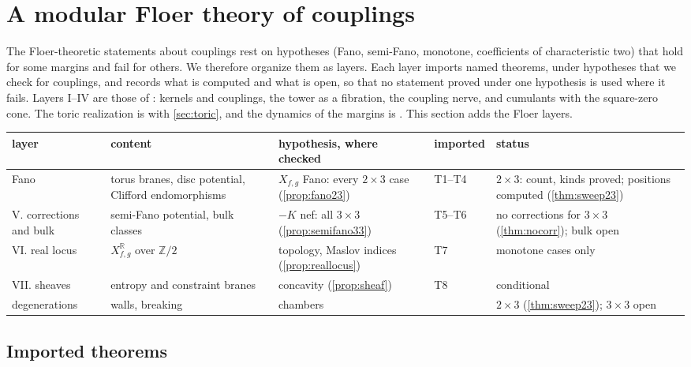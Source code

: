\documentclass[11pt]{article}
\theoremstyle{definition}
\theoremstyle{remark}
\newcommand{\R}{\mathbb{R}}
\newcommand{\Z}{\mathbb{Z}}
\begin{document}
\section{A modular Floer theory of couplings}\label{sec:modular}

The Floer-theoretic statements about couplings rest on hypotheses (Fano, semi-Fano, monotone, coefficients of characteristic
two) that hold for some margins and fail for others. We therefore organize them as layers. Each layer imports named theorems,
under hypotheses that we check for couplings, and records what is computed and what is open, so that no statement proved under
one hypothesis is used where it fails. Layers I--IV are those of \cite{Conditionals}: kernels and couplings, the tower as a
fibration, the coupling nerve, and cumulants with the square-zero cone. The toric realization is \cite[\S6]{Conditionals} with
\cref{sec:toric}, and the dynamics of the margins is \cite{Bands}. This section adds the Floer layers.

\begin{center}
\small
\begin{tabular}{p{2.2cm}p{3.4cm}p{3.4cm}p{1.5cm}p{3.1cm}}
\toprule
layer & content & hypothesis, where checked & imported & status\\
\midrule
Fano & torus branes, disc potential, Clifford endomorphisms & $X_{f,g}$ Fano: every $2\times3$ case (\cref{prop:fano23}) & T1--T4 & $2\times3$: count, kinds proved; positions computed (\cref{thm:sweep23})\\
V. corrections and bulk & semi-Fano potential, bulk classes & $-K$ nef: all $3\times3$ (\cref{prop:semifano33}) & T5--T6 & no corrections for $3\times3$ (\cref{thm:nocorr}); bulk open\\
VI. real locus & $X^{\R}_{f,g}$ over $\Z/2$ & topology, Maslov indices (\cref{prop:reallocus}) & T7 & monotone cases only\\
VII. sheaves & entropy and constraint branes & concavity (\cref{prop:sheaf}) & T8 & conditional\\
degenerations & walls, breaking & chambers \cite[Prop.~10.5]{Conditionals} & \cite{Bands} & $2\times3$ (\cref{thm:sweep23}); $3\times3$ open\\
\bottomrule
\end{tabular}
\end{center}

\subsection{Imported theorems}\label{sec:imported}
\end{document}

